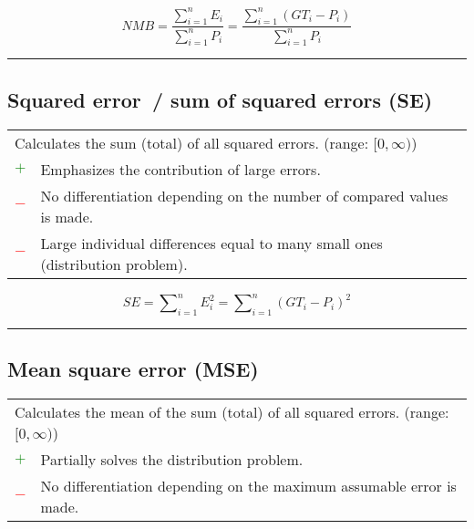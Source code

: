 \documentclass{article}
\begin{document}
\begin{equation}
	\textit{NMB} = \dfrac{\sum\nolimits_{i = 1}^n E_i}{\sum\nolimits_{i = 1}^n P_i} = \dfrac{\sum\nolimits_{i = 1}^n (\textit{GT}_i - P_i)}{\sum\nolimits_{i = 1}^n P_i}
%
	\label{equation:NMB}
\end{equation}

\hrule


\subsection[Squared error~/ sum of squared errors (SE)]{Squared error~/ sum of squared errors (SE) \cite{draper1998applied}}

\begin{table}[H]\centering
	\begin{tabular}{m{}m{}}
		\multicolumn{2}{m{0.95\textwidth}}{Calculates the sum (total) of all squared errors. (range: $[0, \infty)$)} \\
		\textcolor{Green}{$+$} & Emphasizes the contribution of large errors. \\
		\textcolor{Red}{$-$}   & No differentiation depending on the number of compared values is made. \\
		\textcolor{Red}{$-$}   & Large individual differences equal to many small ones (distribution problem).
	\end{tabular}
\end{table}

\begin{equation}
	\textit{SE} = \sum\nolimits_{i = 1}^n E_i^2 = \sum\nolimits_{i = 1}^n (\textit{GT}_i - P_i)^2
%
	\label{equation:SE}
\end{equation}

\hrule


\subsection[Mean square error (MSE)]{Mean square error (MSE) \cite{bickel2015mathematical}}

\begin{table}[H]\centering
	\begin{tabular}{m{}m{}}
		\multicolumn{2}{m{0.95\textwidth}}{Calculates the mean of the sum (total) of all squared errors. (range: $[0, \infty)$)} \\
		\textcolor{Green}{$+$} & Partially solves the distribution problem. \\
		\textcolor{Red}{$-$}   & No differentiation depending on the maximum assumable error is made.
	\end{tabular}
\end{table}
\end{document}

